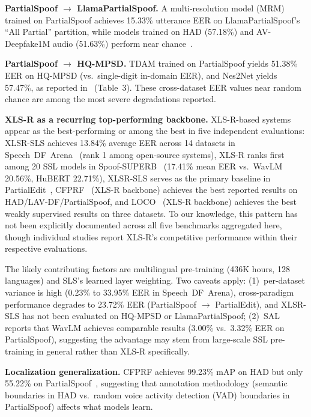 \documentclass[journal]{IEEEtran}
\begin{document}
\textbf{PartialSpoof $\rightarrow$ LlamaPartialSpoof.} A multi-resolution model (MRM) trained on PartialSpoof achieves 15.33\% utterance EER on LlamaPartialSpoof's ``All Partial'' partition, while models trained on HAD (57.18\%) and AV-Deepfake1M audio (51.63\%) perform near chance~\cite{luong2025llamapartialspoof}.

\textbf{PartialSpoof $\rightarrow$ HQ-MPSD.} TDAM trained on PartialSpoof yields 51.38\% EER on HQ-MPSD (vs.\ single-digit in-domain EER), and Nes2Net yields 57.47\%, as reported in~\cite{li2025hqmpsd} (Table~3). These cross-dataset EER values near random chance are among the most severe degradations reported.

\textbf{XLS-R as a recurring top-performing backbone.} XLS-R-based systems appear as the best-performing or among the best in five independent evaluations: XLSR-SLS achieves 13.84\% average EER across 14 datasets in Speech~DF~Arena~\cite{speechdfarena2025} (rank 1 among open-source systems), XLS-R ranks first among 20 SSL models in Spoof-SUPERB~\cite{ali2026spoofsuperb} (17.41\% mean EER vs.\ WavLM 20.56\%, HuBERT 22.71\%), XLSR-SLS serves as the primary baseline in PartialEdit~\cite{zhang2025partialedit}, CFPRF~\cite{wu2024cfprf} (XLS-R backbone) achieves the best reported results on HAD/LAV-DF/PartialSpoof, and LOCO~\cite{wu2025loco} (XLS-R backbone) achieves the best weakly supervised results on three datasets. To our knowledge, this pattern has not been explicitly documented across all five benchmarks aggregated here, though individual studies report XLS-R's competitive performance within their respective evaluations.

The likely contributing factors are multilingual pre-training (436K hours, 128 languages) and SLS's learned layer weighting. Two caveats apply: (1)~per-dataset variance is high (0.23\% to 33.95\% EER in Speech~DF~Arena), cross-paradigm performance degrades to 23.72\% EER (PartialSpoof $\rightarrow$ PartialEdit), and XLSR-SLS has not been evaluated on HQ-MPSD or LlamaPartialSpoof; (2)~SAL~\cite{sal2026} reports that WavLM achieves comparable results (3.00\% vs.\ 3.32\% EER on PartialSpoof), suggesting the advantage may stem from large-scale SSL pre-training in general rather than XLS-R specifically.

\textbf{Localization generalization.} CFPRF achieves 99.23\% mAP on HAD but only 55.22\% on PartialSpoof~\cite{wu2024cfprf}, suggesting that annotation methodology (semantic boundaries in HAD vs.\ random voice activity detection (VAD) boundaries in PartialSpoof) affects what models learn.
\end{document}
